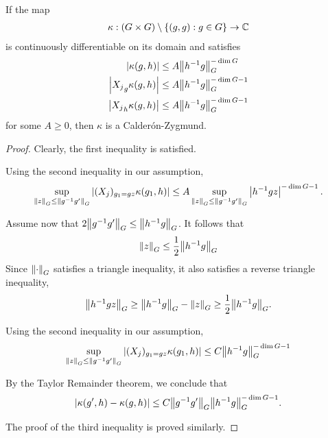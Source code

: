 \begin{lemma}
\label{lemma:Calderon-Zygmund_criteria}
    If the map
    \begin{align*}
        \kappa : (\Group \times \Group) \setminus \{(g, g) : g \in \Group\} \to \C
    \end{align*}
    is continuously differentiable on its domain and satisfies
    \begin{align*}
        \abs {\kappa(g, h)} &\leq A \norm [\Group] {h^{-1} g}^{-\dim \Group}\\
        \abs {\LeftDifferentialOperatorFirstOrder {X_j}_g \kappa(g, h)} &\leq A \norm [\Group] {h^{-1} g}^{-\dim \Group - 1}\\
        \abs {\LeftDifferentialOperatorFirstOrder {X_j}_h \kappa(g, h)} &\leq A \norm [\Group] {h^{-1} g}^{-\dim \Group - 1}
    \end{align*}
    for some $A \geq 0$,
    then $\kappa$ is a Calder\'on-Zygmund.
\end{lemma}
\begin{proof}
    Clearly, the first inequality is satisfied.

    Using the second inequality in our assumption,
    \begin{align*}
        \sup_{\norm [\Group] z \leq \norm [\Group] {g^{-1} g'}} \abs {(X_j)_{g_1 = g z} \kappa(g_1, h)}
        \leq A
        \sup_{\norm [\Group] z \leq \norm [\Group] {g^{-1} g'}} \abs {h^{-1} g z}^{-\dim \Group - 1}.
    \end{align*}

    Assume now that $2 \norm [\Group] {g^{-1} g'} \leq \norm [\Group] {h^{-1} g}$.
    It follows that
    \begin{align*}
        \norm [\Group] z \leq \frac 1 2 \norm [\Group] {h^{-1} g}
    \end{align*}
    Since $\norm [\Group] \dummy$ satisfies a triangle inequality,
    it also satisfies a reverse triangle inequality,
    \begin{align*}
        \norm [\Group] {h^{-1} g z}
        \geq
        \norm [\Group] {h^{-1} g}
        -
        \norm [\Group] {z}
        \geq
        \frac 1 2 \norm [\Group] {h^{-1} g}.
    \end{align*}

    Using the second inequality in our assumption,
    \begin{align*}
        \sup_{\norm [\Group] z \leq \norm [\Group] {g^{-1} g'}} \abs {(X_j)_{g_1 = g z} \kappa(g_1, h)}
        \leq C \norm [\Group] {h^{-1} g}^{-\dim \Group - 1}
    \end{align*}

    By the Taylor Remainder theorem,
    we conclude that
    \begin{align*}
        \abs {\kappa(g', h) - \kappa(g, h)}
        \leq C \norm [\Group] {g^{-1} g'}
        \norm [\Group] {h^{-1} g}^{-\dim \Group - 1}.
    \end{align*}

    The proof of the third inequality is proved similarly.
\end{proof}

